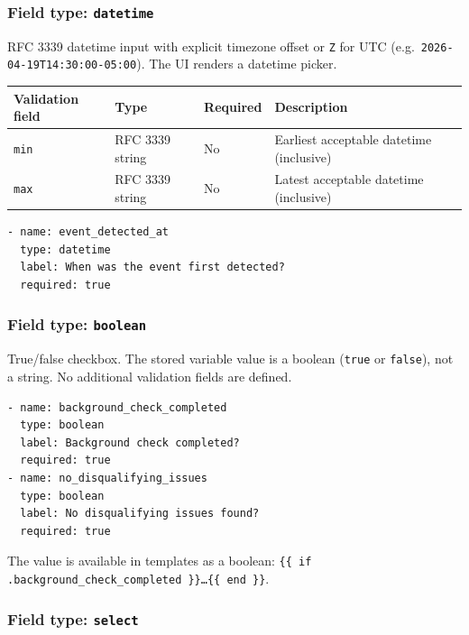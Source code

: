 \subsubsection{Field type: \texttt{datetime}}
\label{subsubsec:field-datetime}

RFC 3339 datetime input with explicit timezone offset or \texttt{Z} for UTC
(e.g.\ \texttt{2026-04-19T14:30:00-05:00}).  The UI renders a datetime picker.

\begin{center}
\begin{tabular}{lllp{5cm}}
\hline
\textbf{Validation field} & \textbf{Type} & \textbf{Required} & \textbf{Description} \\
\hline
\texttt{min} & RFC 3339 string & No & Earliest acceptable datetime (inclusive) \\
\texttt{max} & RFC 3339 string & No & Latest acceptable datetime (inclusive) \\
\hline
\end{tabular}
\end{center}

\begin{verbatim}
- name: event_detected_at
  type: datetime
  label: When was the event first detected?
  required: true
\end{verbatim}

\subsubsection{Field type: \texttt{boolean}}
\label{subsubsec:field-boolean}

True/false checkbox.  The stored variable value is a boolean (\texttt{true}
or \texttt{false}), not a string.  No additional validation fields are defined.

\begin{verbatim}
- name: background_check_completed
  type: boolean
  label: Background check completed?
  required: true
- name: no_disqualifying_issues
  type: boolean
  label: No disqualifying issues found?
  required: true
\end{verbatim}

The value is available in templates as a boolean:
\texttt{\{\{ if .background\_check\_completed \}\}…\{\{ end \}\}}.

\subsubsection{Field type: \texttt{select}}
\label{subsubsec:field-select}

